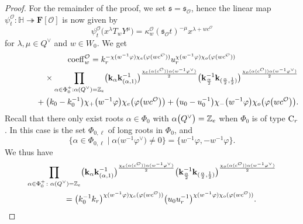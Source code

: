 \documentclass[11pt]{article}
\numberwithin{equation}{section}
\numberwithin{equation}{section}
\begin{document}
\begin{proof}
For the remainder of the proof, we set $\mathfrak{s}=\mathfrak{s}_\mathcal{O}$, hence the linear map $\psi_t^\mathcal{O}\colon \mathbb{H}\twoheadrightarrow\mathbf{F}[\mathcal{O}]$ is now given by
\begin{equation}\label{psitO}
\psi_t^\mathcal{O}\bigl(x^\lambda T_wY^\mu\bigr)=\kappa_w^\mathcal{O}(\mathfrak{s}_\mathcal{O}t)^{-\mu}x^{\lambda+wc^\mathcal{O}}
\end{equation}
for $\lambda,\mu\in Q^\vee$ and $w\in W_0$.
We get
\begin{gather}
{\rm coeff}_w^\mathcal{O}=k_r^{-\chi(w^{-1}\varphi)\chi_e(\varphi(wc^\mathcal{O}))}
u_r^{\chi(w^{-1}\varphi)\chi_o(\varphi(wc^\mathcal{O}))}\nonumber\\
\hphantom{{\rm coeff}_w^\mathcal{O}=}\quad{}
 \times\prod_{\alpha\in\Phi_0^+: \alpha\smash{(Q^\vee)}=\mathbb{Z}_e}
\bigl(\mathbf{k}_\alpha \mathbf{k}_{(\alpha,1)}^{-1}\bigr)^{\frac{\chi_e(\alpha(c^\mathcal{O}))\alpha(w^{-1}\varphi^\vee)}{2}} \bigl(\mathbf{k}_{\frac{\alpha}{2}}^{-1}\mathbf{k}_{(\frac{\alpha}{2},\frac{1}{2})}\bigr)^{\frac{\chi_o(\alpha(c^\mathcal{O}))\alpha(w^{-1}\varphi^\vee)}{2}}\nonumber\\
\hphantom{{\rm coeff}_w^\mathcal{O}=}{}
+\bigl(k_0-k_0^{-1}\bigr)\chi_+\bigl(w^{-1}\varphi\bigr)\chi_e\bigl(\varphi\bigl(wc^\mathcal{O}\bigr)\bigr)+
\bigl(u_0-u_0^{-1}\bigr)\chi_-\bigl(w^{-1}\varphi\bigr)\chi_o\bigl(\varphi\bigl(wc^\mathcal{O}\bigr)\bigr).
\label{coeffmid}
\end{gather}
Recall that there only exist roots $\alpha\in\Phi_0$ with $\alpha\smash{\bigl(Q^\vee\bigr)}=\mathbb{Z}_e$ when $\Phi_0$ is of type ${\rm C}_r$. In this case
 is the set $\Phi_{0,\ell}$ of long roots in $\Phi_0$, and
\[
\bigl\{\alpha\in\Phi_{0,\ell} \mid \alpha\bigl(w^{-1}\varphi^\vee\bigr)\not=0\bigr\}=\big\{w^{-1}\varphi,-w^{-1}\varphi\big\}.
\]
We thus have
\begin{gather*}
\prod_{\alpha\in\Phi_0^+\colon \alpha\smash{(Q^\vee)}=\mathbb{Z}_e}
\bigl(\mathbf{k}_\alpha \mathbf{k}_{(\alpha,1)}^{-1}\bigr)^{\frac{\chi_e(\alpha(c^\mathcal{O}))\alpha(w^{-1}\varphi^\vee)}{2}} \bigl(\mathbf{k}_{\frac{\alpha}{2}}^{-1}\mathbf{k}_{(\frac{\alpha}{2},\frac{1}{2})}\bigr)^{\frac{\chi_o(\alpha(c^\mathcal{O}))\alpha(w^{-1}\varphi^\vee)}{2}}\\
\qquad{}=
\bigl(k_0^{-1}k_r\bigr)^{\chi(w^{-1}\varphi)\chi_e(\varphi(wc^\mathcal{O}))}
\bigl(u_0u_r^{-1}\bigr)^{\chi(w^{-1}\varphi)\chi_o(\varphi(wc^\mathcal{O}))}.\label{hhhelp}

\end{gather*}
\end{proof}
\end{document}
